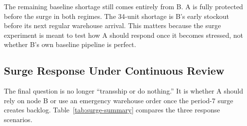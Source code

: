 \documentclass[11pt]{article}
\begin{document}
The remaining baseline shortage still comes entirely from B. A is fully protected before the surge in both regimes. The 34-unit shortage is B's early stockout before its next regular warehouse arrival. This matters because the surge experiment is meant to test how A should respond once it becomes stressed, not whether B's own baseline pipeline is perfect.

\subsection{Surge Response Under Continuous Review}
The final question is no longer ``transship or do nothing.'' It is whether A should rely on node B or use an emergency warehouse order once the period-7 surge creates backlog. Table~\ref{tab:surge-summary} compares the three response scenarios.

\begin{table}[H]
\centering
\caption{Surge-at-period-7 results under continuous review}
\label{tab:surge-summary}
\small
\setlength{\tabcolsep}{4pt}
\end{table}
\end{document}
